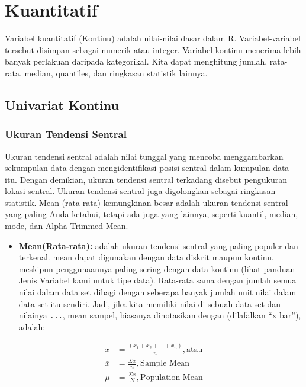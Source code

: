 \documentclass[
]{book}
\providecommand{\tightlist}{%
  \setlength{\itemsep}{0pt}\setlength{\parskip}{0pt}}
\begin{document}
\hypertarget{kuantitatif}{%
\section{Kuantitatif}\label{kuantitatif}}

Variabel kuantitatif (Kontinu) adalah nilai-nilai dasar dalam R. Variabel-variabel tersebut disimpan sebagai numerik atau integer. Variabel kontinu menerima lebih banyak perlakuan daripada kategorikal. Kita dapat menghitung jumlah, rata-rata, median, quantiles, dan ringkasan statistik lainnya.

\hypertarget{univariat-kontinu}{%
\subsection{Univariat Kontinu}\label{univariat-kontinu}}

\hypertarget{ukuran-tendensi-sentral}{%
\subsubsection*{Ukuran Tendensi Sentral}\label{ukuran-tendensi-sentral}}

Ukuran tendensi sentral adalah nilai tunggal yang mencoba menggambarkan sekumpulan data dengan mengidentifikasi posisi sentral dalam kumpulan data itu. Dengan demikian, ukuran tendensi sentral terkadang disebut pengukuran lokasi sentral. Ukuran tendensi sentral juga digolongkan sebagai ringkasan statistik. Mean (rata-rata) kemungkinan besar adalah ukuran tendensi sentral yang paling Anda ketahui, tetapi ada juga yang lainnya, seperti kuantil, median, mode, dan Alpha Trimmed Mean.

\begin{itemize}
\tightlist
\item
  \textbf{Mean(Rata-rata):} adalah ukuran tendensi sentral yang paling populer dan terkenal. mean dapat digunakan dengan data diskrit maupun kontinu, meskipun penggunaannya paling sering dengan data kontinu (lihat panduan Jenis Variabel kami untuk tipe data). Rata-rata sama dengan jumlah semua nilai dalam data set dibagi dengan seberapa banyak jumlah unit nilai dalam data set itu sendiri. Jadi, jika kita memiliki nilai di sebuah data set dan nilainya \texttt{...}, mean sampel, biasanya dinotasikan dengan (dilafalkan ``x bar''), adalah:
\end{itemize}

\[
\begin{aligned}
\bar{x}&=\frac{(x_1+x_2+...+x_n)}{n}, \text{atau}\\
\bar{x}&=\frac{\Sigma{x}}{n}, \text{Sample Mean}  \\
\mu &=\frac{\Sigma{x}}{N}, \text{Population Mean}
\end{aligned}
\]
\end{document}
